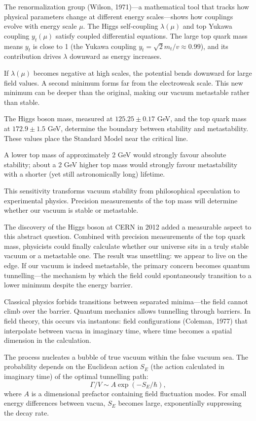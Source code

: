 The renormalization group (Wilson, 1971)—a mathematical tool that tracks how physical parameters change at different energy scales—shows how couplings evolve with energy scale $\mu$. The Higgs self-coupling $\lambda(\mu)$ and top Yukawa coupling $y_t(\mu)$ satisfy coupled differential equations. The large top quark mass means $y_t$ is close to 1 (the Yukawa coupling $y_t = \sqrt{2}m_t/v \approx 0.99$), and its contribution drives $\lambda$ downward as energy increases.

If $\lambda(\mu)$ becomes negative at high scales, the potential bends downward for large field values. A second minimum forms far from the electroweak scale. This new minimum can be deeper than the original, making our vacuum metastable rather than stable.

The Higgs boson mass, measured at $125.25 \pm 0.17$ GeV, and the top quark mass at $172.9 \pm 1.5$ GeV, determine the boundary between stability and metastability. These values place the Standard Model near the critical line.

A lower top mass of approximately 2 GeV would strongly favour absolute stability; about a 2 GeV higher top mass would strongly favour metastability with a shorter (yet still astronomically long) lifetime.

This sensitivity transforms vacuum stability from philosophical speculation to experimental physics. Precision measurements of the top mass will determine whether our vacuum is stable or metastable.

The discovery of the Higgs boson at CERN in 2012 added a measurable aspect to this abstract question. Combined with precision measurements of the top quark mass, physicists could finally calculate whether our universe sits in a truly stable vacuum or a metastable one. The result was unsettling: we appear to live on the edge. If our vacuum is indeed metastable, the primary concern becomes quantum tunnelling—the mechanism by which the field could spontaneously transition to a lower minimum despite the energy barrier.

Classical physics forbids transitions between separated minima—the field cannot climb over the barrier. Quantum mechanics allows tunnelling through barriers. In field theory, this occurs via instantons: field configurations (Coleman, 1977) that interpolate between vacua in imaginary time, where time becomes a spatial dimension in the calculation.

The process nucleates a bubble of true vacuum within the false vacuum sea. The probability depends on the Euclidean action $S_E$ (the action calculated in imaginary time) of the optimal tunnelling path:
\[
\Gamma/V \sim A \exp(-S_E/\hbar),
\]
where $A$ is a dimensional prefactor containing field fluctuation modes. For small energy differences between vacua, $S_E$ becomes large, exponentially suppressing the decay rate.

